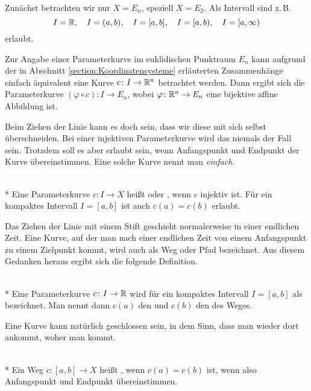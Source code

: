 \noindent
Zunächst betrachten wir nur $X=E_n$, speziell $X=E_2$. Als Intervall
sind z.\,B.%
\[I=\mathbb R,\quad I=(a,b),\quad I=[a,b],\quad
I=[a,b),\quad I=[a,\infty)\]
erlaubt.

Zur Angabe einer Parameterkurve im euklidischen Punktraum $E_n$ kann
aufgrund der in Abschnitt \ref{section:Koordinatensysteme} erläuterten
Zusammenhänge einfach äquivalent eine Kurve $c\colon I \to\mathbb R^n$
betrachtet werden. Dann ergibt sich die Parameterkurve
$(\varphi\circ c)\colon I\to E_n$,
wobei $\varphi\colon \mathbb R^n\to E_n$ eine bijektive affine Abbildung ist.

Beim Ziehen der Linie kann es doch sein, dass wir diese mit sich selbst
überschneiden. Bei einer injektiven Parameterkurve wird das niemals
der Fall sein. Trotzdem soll es aber erlaubt sein, wenn Anfangspunkt
und Endpunkt der Kurve übereinstimmen. Eine solche Kurve nennt man
\emph{einfach}.

\begin{definition}\mbox{}\\*
Eine Parameterkurve $c\colon I\to X$ heißt  oder
, wenn $c$ injektiv ist. Für ein kompaktes
Intervall $I=[a,b]$ ist auch $c(a)=c(b)$ erlaubt.
\end{definition}

\noindent
Das Ziehen der Linie mit einem Stift geschieht normalerweise in einer
endlichen Zeit. Eine Kurve, auf der man nach einer endlichen Zeit
von einem Anfangspunkt zu einem Zielpunkt kommt, wird auch als
Weg oder Pfad bezeichnet. Aus diesem Gedanken heraus
ergibt sich die folgende Definition.

\begin{definition}\mbox{}\\*
Eine Parameterkurve $c\colon I\to\mathbb R$ wird für ein kompaktes
Intervall $I=[a,b]$ als  bezeichnet. Man nennt dann
$c(a)$ den  und $c(b)$ den
 des Weges.
\end{definition}

\noindent
Eine Kurve kann natürlich geschlossen sein, in dem Sinn, dass man
wieder dort ankommt, woher man kommt.

\begin{definition}\mbox{}\\*
Ein Weg $c\colon [a,b]\to X$ heißt ,
wenn $c(a)=c(b)$ ist, wenn also Anfangspunkt und
Endpunkt übereinstimmen.
\end{definition}

